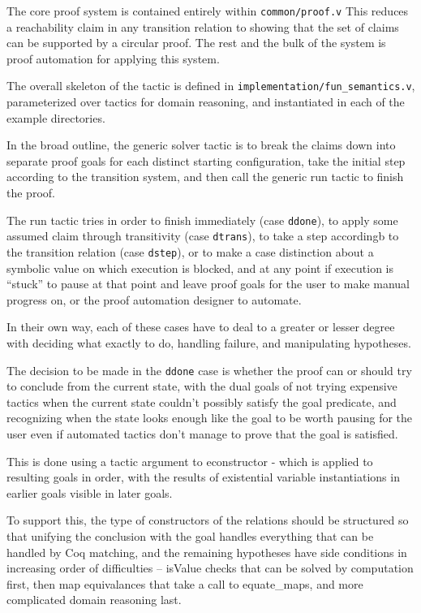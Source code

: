 \documentclass{article}
\begin{document}
The core proof system is contained entirely within \verb|common/proof.v|
This reduces a reachability claim in any transition relation to
showing that the set of claims can be supported by a circular proof.
The rest and the bulk of the system is proof automation for applying
this system.

The overall skeleton of the tactic is defined in
\verb|implementation/fun_semantics.v|, parameterized over
tactics for domain reasoning, and instantiated in each of the
example directories.

In the broad outline, the generic solver tactic is to break
the claims down into separate proof goals for each distinct
starting configuration, take the initial step according to
the transition system, and then call the generic run tactic
to finish the proof.

The run tactic tries in order to finish immediately
(case \verb|ddone|), to apply some assumed claim through
transitivity (case \verb|dtrans|), to take a step
accordingb to the transition relation (case \verb|dstep|),
or to make a case distinction about a symbolic value on which
execution is blocked, and at any point if execution is
``stuck'' to pause at that point and leave proof goals for
the user to make manual progress on, or the proof automation
designer to automate.

In their own way, each of these cases have to deal to a greater
or lesser degree with deciding what exactly to do,
handling failure, and manipulating hypotheses.

The decision to be made in the \verb|ddone| case is whether
the proof can or should try to conclude from the current state,
with the dual goals of not trying expensive tactics when the
current state couldn't possibly satisfy the goal predicate,
and recognizing when the state looks enough like the goal to
be worth pausing for the user even if automated tactics don't
manage to prove that the goal is satisfied.

This is done using a tactic argument to econstructor -
which is applied to resulting goals in order, with the
results of existential variable instantiations in earlier
goals visible in later goals.

To support this, the type of constructors of the relations
should be structured so that unifying the conclusion with the
goal handles everything that can be handled by Coq matching,
and the remaining hypotheses have side conditions in increasing
order of difficulties --  isValue checks that can be solved
by computation first, then map equivalances that take a
call to equate_maps, and more complicated domain reasoning
last.
\end{document}
